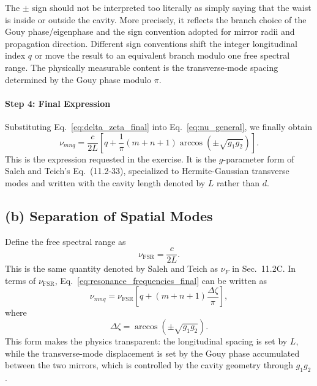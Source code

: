 \begin{resolucao}[Solution]
        The $\pm$ sign should not be interpreted too literally as simply saying that the waist is inside or outside the cavity. More precisely, it reflects the branch choice of the Gouy phase/eigenphase and the sign convention adopted for mirror radii and propagation direction. Different sign conventions shift the integer longitudinal index $q$ or move the result to an equivalent branch modulo one free spectral range. The physically measurable content is the transverse-mode spacing determined by the Gouy phase modulo $\pi$.

    \paragraph*{Step 4: Final Expression}
        Substituting Eq.~\eqref{eq:delta_zeta_final} into Eq.~\eqref{eq:nu_general}, we finally obtain
        \begin{equation}
            \boxed{
            \nu_{mnq}
            =
            \frac{c}{2L}
            \left[
                q
                +
                \frac{1}{\pi}
                (m+n+1)
                \arccos\left(
                    \pm\sqrt{g_1g_2}
                \right)
            \right]
            }.
            \label{eq:resonance_frequencies_final}
        \end{equation}
        This is the expression requested in the exercise. It is the $g$-parameter form of Saleh and Teich's Eq.~(11.2-33), specialized to Hermite-Gaussian transverse modes and written with the cavity length denoted by $L$ rather than $d$.

\vspace{0.5cm}
\subsection*{(b) Separation of Spatial Modes}

    Define the free spectral range as
    \begin{equation}
        \nu_{\mathrm{FSR}}
        =
        \frac{c}{2L}.
        \label{eq:fsr_definition}
    \end{equation}
    This is the same quantity denoted by Saleh and Teich as $\nu_F$ in Sec.~11.2C. In terms of $\nu_{\mathrm{FSR}}$, Eq.~\eqref{eq:resonance_frequencies_final} can be written as
    \begin{equation}
        \nu_{mnq}
        =
        \nu_{\mathrm{FSR}}
        \left[
            q
            +
            (m+n+1)
            \frac{\Delta\zeta}{\pi}
        \right],
        \label{eq:resonance_frequencies_fsr}
    \end{equation}
    where
    \begin{equation}
        \Delta\zeta
        =
        \arccos\left(
            \pm\sqrt{g_1g_2}
        \right).
    \end{equation}
    This form makes the physics transparent: the longitudinal spacing is set by $L$, while the transverse-mode displacement is set by the Gouy phase accumulated between the two mirrors, which is controlled by the cavity geometry through $g_1g_2$.


\end{resolucao}
